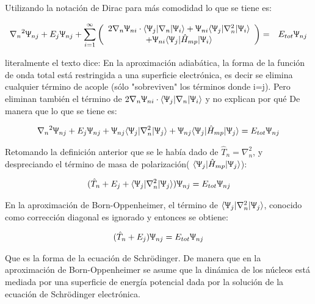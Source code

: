 \documentclass [11pt]{article}
\begin{document}
Utilizando la notación de Dirac para más comodidad lo que se tiene es:

\begin{eqnarray*}
    {\nabla_n}^2\Uppsi_{nj}+E_j \Uppsi_{nj}+\sum_{i=1}^{\infty}\left(
    \begin{array}{cc}
         2{\nabla_n}\Uppsi_{ni}\cdot\langle\Uppsi_j|\nabla_n|\Uppsi_i\rangle+\Uppsi_{ni}\langle\Uppsi_j|{\nabla_n^2}|\Uppsi_i\rangle\\
         +\Uppsi_{ni}\langle\Uppsi_j|{\hat H}_{mp}|\Uppsi_i\rangle
    \end{array}\right) & = & E_{tot}\Uppsi_{nj}
\end{eqnarray*}

{\color{red} literalmente el texto dice: En la aproximación adiabática, la forma de la función de onda total está restringida a una superficie electrónica, es decir se elimina cualquier término de acople (sólo "sobreviven" los términos donde i=j). Pero eliminan también el término de $2{\nabla_n}\Uppsi_{ni}\cdot\langle\Uppsi_j|\nabla_n|\Uppsi_i\rangle$ y no explican por qué } De manera que lo que se tiene es:

\begin{eqnarray*}
    {\nabla_n}^2\Uppsi_{nj}+E_j \Uppsi_{nj}+\Uppsi_{nj}\langle\Uppsi_j|{\nabla_n^2}|\Uppsi_j\rangle+\Uppsi_{nj}\langle\Uppsi_j|{\hat H}_{mp}|\Uppsi_j\rangle =  E_{tot}\Uppsi_{nj}
\end{eqnarray*}

Retomando la definición anterior que se le había dado de $\hat T_n=\nabla_n^2$, y despreciando el término de masa de polarización( $\langle\Uppsi_j|{\hat H}_{mp}|\Uppsi_j\rangle$):

\begin{eqnarray*}
    (\hat T_n+E_j+\langle\Uppsi_j|{\nabla_n^2}|\Uppsi_j\rangle) \Uppsi_{nj} =  E_{tot}\Uppsi_{nj}
\end{eqnarray*}

En la aproximación de Born-Oppenheimer, el término de $\langle\Uppsi_j|{\nabla_n^2}|\Uppsi_j\rangle$, conocido como corrección diagonal es ignorado y entonces se obtiene:

\begin{eqnarray*}
    (\hat T_n+E_j) \Uppsi_{nj} =  E_{tot}\Uppsi_{nj}
\end{eqnarray*}

Que es la forma de la ecuación de Schrödinger. De manera que en la aproximación de Born-Oppenheimer se asume que la dinámica de los núcleos está mediada por una superficie de energía potencial dada por la solución de la ecuación de Schrödinger electrónica.
\end{document}
